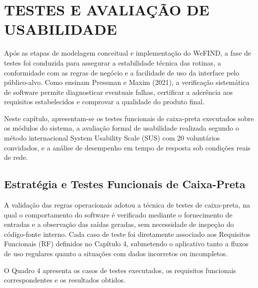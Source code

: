 \section{TESTES E AVALIAÇÃO DE USABILIDADE}

Após as etapas de modelagem conceitual e implementação do WeFIND, a fase de testes foi conduzida para assegurar a estabilidade técnica das rotinas, a conformidade com as regras de negócio e a facilidade de uso da interface pelo público-alvo. Como ensinam Pressman e Maxim (2021), a verificação sistemática de software permite diagnosticar eventuais falhas, certificar a aderência aos requisitos estabelecidos e comprovar a qualidade do produto final.

Neste capítulo, apresentam-se os testes funcionais de caixa-preta executados sobre os módulos do sistema, a avaliação formal de usabilidade realizada segundo o método internacional System Usability Scale (SUS) com 20 voluntários convidados, e a análise de desempenho em tempo de resposta sob condições reais de rede.

\subsection{Estratégia e Testes Funcionais de Caixa-Preta}

A validação das regras operacionais adotou a técnica de testes de caixa-preta, na qual o comportamento do software é verificado mediante o fornecimento de entradas e a observação das saídas geradas, sem necessidade de inspeção do código-fonte interno. Cada caso de teste foi diretamente associado aos Requisitos Funcionais (RF) definidos no Capítulo 4, submetendo o aplicativo tanto a fluxos de uso regulares quanto a situações com dados incorretos ou incompletos.

O Quadro 4 apresenta os casos de testes executados, os requisitos funcionais correspondentes e os resultados obtidos.

